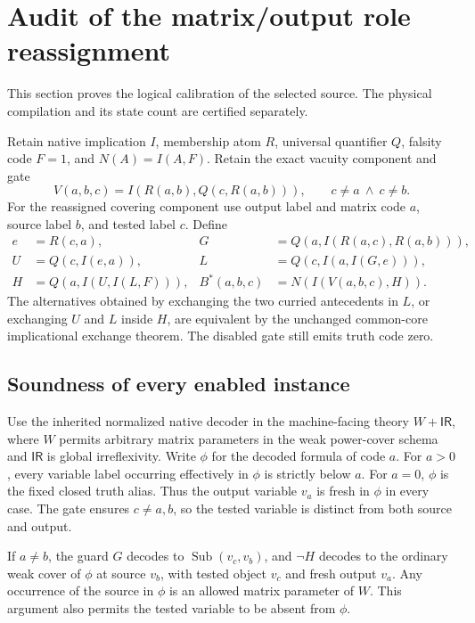 \section{Audit of the matrix/output role reassignment}

This section proves the logical calibration of the selected source.
The physical compilation and its state count are certified separately.

Retain native implication $I$, membership atom $R$, universal
quantifier $Q$, falsity code $F=1$, and $N(A)=I(A,F)$. Retain the exact
vacuity component and gate
\[
 V(a,b,c)=I(R(a,b),Q(c,R(a,b))),\qquad c\ne a\ \land\ c\ne b.
\]
For the reassigned covering component use output label and matrix code
$a$, source label $b$, and tested label $c$. Define
\begin{align*}
 e&=R(c,a), & G&=Q(a,I(R(a,c),R(a,b))),\\
 U&=Q(c,I(e,a)), & L&=Q(c,I(a,I(G,e))),\\
 H&=Q(a,I(U,I(L,F))), & B^*(a,b,c)&=N(I(V(a,b,c),H)).
\end{align*}
The alternatives obtained by exchanging the two curried antecedents in
$L$, or exchanging $U$ and $L$ inside $H$, are equivalent by the
unchanged common-core implicational exchange theorem. The disabled gate
still emits truth code zero.

\subsection{Soundness of every enabled instance}

Use the inherited normalized native decoder in the machine-facing
theory $W+\mathsf{IR}$, where $W$ permits arbitrary matrix parameters
in the weak power-cover schema and $\mathsf{IR}$ is global
irreflexivity. Write $\phi$ for the decoded formula of code $a$.
For $a>0$, every variable label occurring effectively in $\phi$ is
strictly below $a$. For $a=0$, $\phi$ is the fixed closed truth alias.
Thus the output variable $v_a$ is fresh in $\phi$ in every case.
The gate ensures $c\ne a,b$, so the tested variable is distinct from
both source and output.

If $a\ne b$, the guard $G$ decodes to
$\operatorname{Sub}(v_c,v_b)$, and $\neg H$ decodes to the ordinary
weak cover of $\phi$ at source $v_b$, with tested object $v_c$ and
fresh output $v_a$. Any occurrence of the source in $\phi$ is an
allowed matrix parameter of $W$. This argument also permits the tested
variable to be absent from $\phi$.

